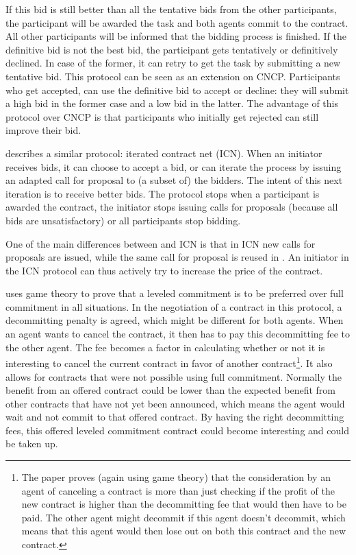 \documentclass[10pt,a4paper,twocolumn]{article}
\begin{document}
If this bid is still better than all the tentative bids from the other participants, the participant will be awarded the task and both agents commit to the contract. All other participants will be informed that the bidding process is finished. If the definitive bid is not the best bid, the participant gets tentatively or definitively declined. In case of the former, it can retry to get the task by submitting a new tentative bid. This protocol can be seen as an extension on CNCP. Participants who get accepted, can use the definitive bid to accept or decline: they will submit a high bid in the former case and a low bid in the latter. The advantage of this protocol over CNCP is that participants who initially get rejected can still improve their bid.

\cite{CNETIterativeStandard} describes a similar protocol: iterated contract net (ICN). When an initiator receives bids, it can choose to accept a bid, or can iterate the process by issuing an adapted call for proposal to (a subset of) the bidders. The intent of this next iteration is to receive better bids. The protocol stops when a participant is awarded the contract, the initiator stops issuing calls for proposals (because all bids are unsatisfactory) or all participants stop bidding.

One of the main differences between \cite{TentativeBidding} and ICN is that in ICN new calls for proposals are issued, while the same call for proposal is reused in \cite{TentativeBidding}. An initiator in the ICN protocol can thus actively try to increase the price of the contract.  

\cite{LeveledCommitment} uses game theory to prove that a leveled commitment is to be preferred over full commitment in all situations. In the negotiation of a contract in this protocol, a decommitting penalty is agreed, which might be different for both agents. When an agent wants to cancel the contract, it then has to pay this decommitting fee to the other agent. The fee becomes a factor in calculating whether or not it is interesting to cancel the current contract in favor of another contract\footnote{The paper proves (again using game theory) that the consideration by an agent of canceling a contract is more than just checking if the profit of the new contract is higher than the decommitting fee that would then have to be paid. The other agent might decommit if this agent doesn't decommit, which means that this agent would then lose out on both this contract and the new contract.}. It also allows for contracts that were not possible using full commitment. Normally the benefit from an offered contract could be lower than the expected benefit from other contracts that have not yet been announced, which means the agent would wait and not commit to that offered contract. By having the right decommitting fees, this offered leveled commitment contract could become interesting and could be taken up.
\end{document}

